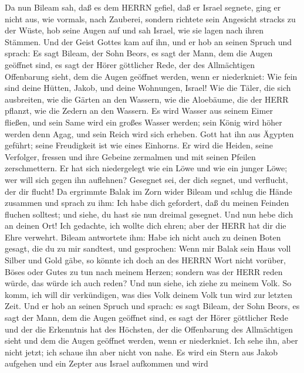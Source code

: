  Da nun Bileam sah, daß es dem HERRN gefiel, daß er Israel
segnete, ging er nicht aus, wie vormals, nach Zauberei, sondern richtete
sein Angesicht stracks zu der Wüste,  hob seine Augen auf
und sah Israel, wie sie lagen nach ihren Stämmen. Und der Geist Gottes
kam auf ihn,  und er hob an seinen Spruch und sprach: Es
sagt Bileam, der Sohn Beors, es sagt der Mann, dem die Augen geöffnet
sind,  es sagt der Hörer göttlicher Rede, der des
Allmächtigen Offenbarung sieht, dem die Augen geöffnet werden, wenn er
niederkniet:  Wie fein sind deine Hütten, Jakob, und deine
Wohnungen, Israel!  Wie die Täler, die sich ausbreiten, wie
die Gärten an den Wassern, wie die Aloebäume, die der HERR pflanzt, wie
die Zedern an den Wassern.  Es wird Wasser aus seinem Eimer
fließen, und sein Same wird ein großes Wasser werden; sein König wird
höher werden denn Agag, und sein Reich wird sich erheben. 
Gott hat ihn aus Ägypten geführt; seine Freudigkeit ist wie eines
Einhorns. Er wird die Heiden, seine Verfolger, fressen und ihre Gebeine
zermalmen und mit seinen Pfeilen zerschmettern.  Er hat sich
niedergelegt wie ein Löwe und wie ein junger Löwe; wer will sich gegen
ihn auflehnen? Gesegnet sei, der dich segnet, und verflucht, der dir
flucht!  Da ergrimmte Balak im Zorn wider Bileam und schlug
die Hände zusammen und sprach zu ihm: Ich habe dich gefordert, daß du
meinen Feinden fluchen solltest; und siehe, du hast sie nun dreimal
gesegnet.  Und nun hebe dich an deinen Ort! Ich gedachte,
ich wollte dich ehren; aber der HERR hat dir die Ehre verwehrt.
 Bileam antwortete ihm: Habe ich nicht auch zu deinen Boten
gesagt, die du zu mir sandtest, und gesprochen:  Wenn mir
Balak sein Haus voll Silber und Gold gäbe, so könnte ich doch an des
HERRN Wort nicht vorüber, Böses oder Gutes zu tun nach meinem Herzen;
sondern was der HERR reden würde, das würde ich auch reden?
 Und nun siehe, ich ziehe zu meinem Volk. So komm, ich will
dir verkündigen, was dies Volk deinem Volk tun wird zur letzten Zeit.
 Und er hob an seinen Spruch und sprach: es sagt Bileam,
der Sohn Beors, es sagt der Mann, dem die Augen geöffnet sind,
 es sagt der Hörer göttlicher Rede und der die Erkenntnis
hat des Höchsten, der die Offenbarung des Allmächtigen sieht und dem die
Augen geöffnet werden, wenn er niederkniet.  Ich sehe ihn,
aber nicht jetzt; ich schaue ihn aber nicht von nahe. Es wird ein Stern
aus Jakob aufgehen und ein Zepter aus Israel aufkommen und wird
